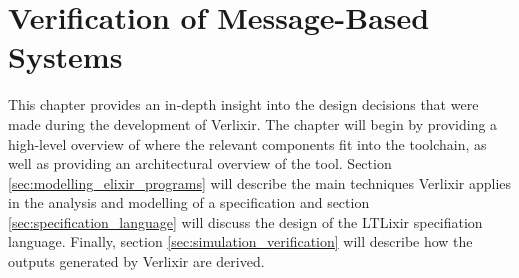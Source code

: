 \chapter{Verification of Message-Based Systems} \label{chap:design}
This chapter provides an in-depth insight into the design decisions that were made during the development of Verlixir. The chapter will begin by providing a high-level overview of where the relevant components fit into the toolchain, as well as providing an architectural overview of the tool. Section \ref{sec:modelling_elixir_programs} will describe the main techniques Verlixir applies in the analysis and modelling of a specification and section \ref{sec:specification_language} will discuss the design of the LTLixir specifiation language. Finally, section \ref{sec:simulation_verification} will describe how the outputs generated by Verlixir are derived.  
